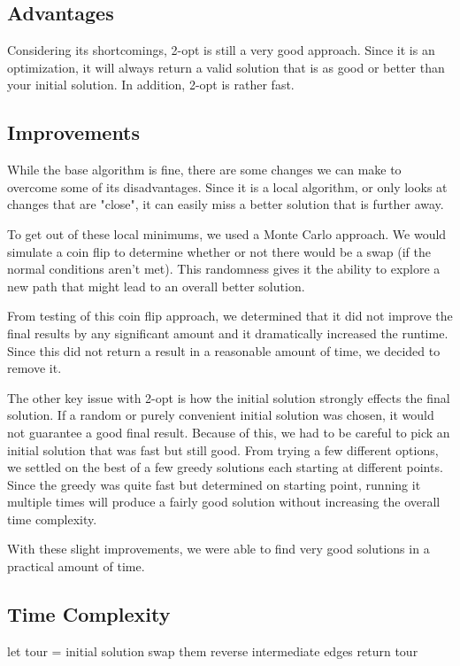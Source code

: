 \documentclass[12pt]{report}
\begin{document}
\begin{multicols}{2}
    \subsection{Advantages}
    Considering its shortcomings, 2-opt is still a very good approach. Since it is an optimization, it will always return a valid solution that is as good or better than your initial solution. In addition, 2-opt is rather fast.
    \subsection{Improvements}
    While the base algorithm is fine, there are some changes we can make to overcome some of its disadvantages. Since it is a local algorithm, or only looks at changes that are "close", it can easily miss a better solution that is further away.

    To get out of these local minimums, we used a Monte Carlo approach. We would simulate a coin flip to determine whether or not there would be a swap (if the normal conditions aren't met). This randomness gives it the ability to explore a new path that might lead to an overall better solution.

    From testing of this coin flip approach, we determined that it did not improve the final results by any significant amount and it dramatically increased the runtime. Since this did not return a result in a reasonable amount of time, we decided to remove it.

    The other key issue with 2-opt is how the initial solution strongly effects the final solution. If a random or purely convenient initial solution was chosen, it would not guarantee a good final result. Because of this, we had to be careful to pick an initial solution that was fast but still good. From trying a few different options, we settled on the best of a few greedy solutions each starting at different points. Since the greedy was quite fast but determined on starting point, running it multiple times will produce a fairly good solution without increasing the overall time complexity.

    With these slight improvements, we were able to find very good solutions in a practical amount of time.
\end{multicols}

\newpage

\subsection{Time Complexity}
\begin{algorithm}
\caption{2-opt algorithm}
\label{2opt_Alg}
\begin{algorithmic}[1]
    \State let tour = initial solution
    \State swap them
    \State reverse intermediate edges
    \EndIf
    \EndFor
    \EndWhile
    \State return tour
\EndProcedure
\end{algorithmic}
\end{algorithm}
\end{document}
